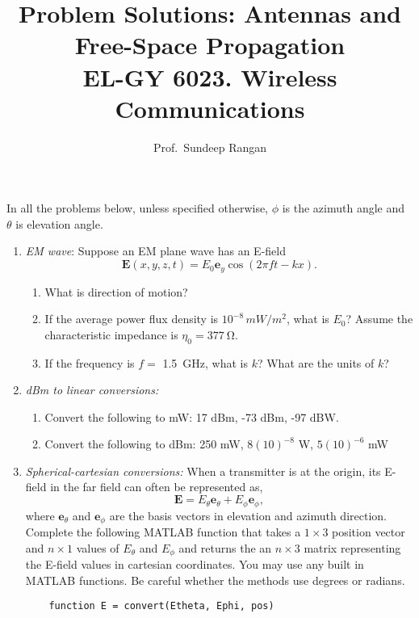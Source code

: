 \documentclass[11pt]{article}
\newcommand{\ebf}{\mathbf{e}}
\newcommand{\Ebf}{\mathbf{E}}
\begin{document}
\title{Problem Solutions:  Antennas and Free-Space Propagation\\
EL-GY 6023. Wireless Communications}
\author{Prof.\ Sundeep Rangan}
\date{}

\maketitle

In all the problems below, unless specified otherwise, $\phi$ is the
azimuth angle and $\theta$ is elevation angle.

\begin{enumerate}
\item \emph{EM wave}:  Suppose an EM plane wave has an E-field
\[
    \Ebf(x,y,z,t) = E_0 \ebf_y \cos(2\pi f t - kx).
\]
\begin{enumerate}[label=(\alph*)]
  \item What is direction of motion?
  \item If the average power flux density is $10^{-8}\, \si{mW/m^2}$, what is $E_0$?
   Assume the characteristic impedance is $\eta_0 = \SI{377}{\ohm}$.
  \item If the frequency is $f=$ \SI{1.5}{GHz}, what is $k$?
  What are the units of $k$?
\end{enumerate}

\item \emph{dBm to linear conversions:}
\begin{enumerate}[label=(\alph*)]
\item Convert the following to mW:   17 dBm, -73 dBm, -97 dBW.
\item Convert the following to dBm: 250 mW, $8(10)^{-8}$ W, $5(10)^{-6}$ mW
\end{enumerate}



\item \emph{Spherical-cartesian conversions:}  When a transmitter is at the origin,
its E-field in the far field can often be represented as,
\[
    \Ebf = E_\theta \ebf_\theta + E_\phi \ebf_\phi,
\]
where $\ebf_\theta$ and $\ebf_\phi$ are the basis vectors in elevation and azimuth direction.
Complete the following MATLAB function that takes a $1\times 3$ position vector
 and $n \times 1$ values of $E_\theta$ and $E_\phi$ and returns the
an $n \times 3$ matrix  representing the E-field values in cartesian coordinates.
You may use any built in MATLAB functions.  Be careful whether the methods use degrees
or radians.
\begin{lstlisting}
    function E = convert(Etheta, Ephi, pos)
\end{lstlisting}



\end{enumerate}
\end{document}
